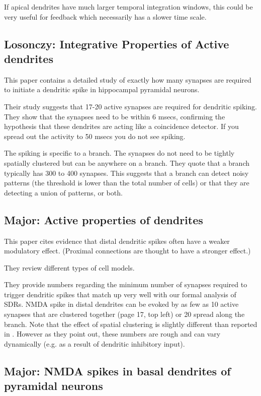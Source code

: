\documentclass{article} %
\begin{document}
If apical dendrites have much larger temporal integration windows, this could be
very useful for feedback which necessarily has a slower time scale.

\subsection{Losonczy: Integrative Properties of Active dendrites}

This paper \cite{Losonczy2006} contains a detailed study of exactly how many
synapses are required to initiate a dendritic spike in hippocampal pyramidal
neurons.

Their study suggests that 17-20 active synapses are required for
dendritic spiking. They show that the synapses need to be within 6 msecs,
confirming the hypothesis that these dendrites are acting like a coincidence
detector.  If you spread out the activity to 50 msecs you do not see spiking.

The spiking is specific to a branch. The synapses do not need to be
tightly spatially clustered but can be anywhere on a branch. They quote that
a branch typically has 300 to 400 synapses. This suggests that a branch can
detect noisy patterns (the threshold is lower than the total number of cells)
or that they are detecting a union of patterns, or both.

\subsection{Major: Active properties of dendrites}

This paper \cite{Major2013} cites evidence that distal dendritic spikes often
have a weaker modulatory effect. (Proximal connections are thought to have a
stronger effect.)

They review different types of cell models.

They provide numbers regarding the minimum number of synapses required to
trigger dendritic spikes that match up very well with our formal analysis of
SDRs.  NMDA spike in distal dendrites can be evoked by as few as 10 active
synapses that are clustered together (page 17, top left) or 20 spread along
the branch. Note that the effect of spatial clustering is slightly different
than reported in \cite{Losonczy2006}.  However as they point out,
these numbers are rough and can vary dynamically (e.g. as a result of
dendritic inhibitory input).

\subsection{Major: NMDA spikes in basal dendrites of pyramidal neurons}
\end{document}
